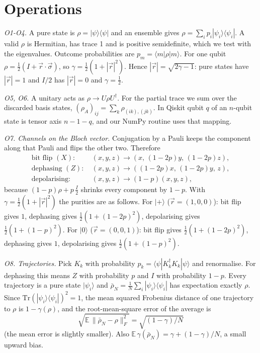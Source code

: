 \documentclass[10pt]{article}
\newcommand{\tr}{\mathrm{Tr}}
\newcommand{\lab}[1]{\noindent\textit{#1}\;}
\begin{document}
\section{Operations}
\lab{O1-O4.} A pure state is $\rho=|\psi\rangle\langle\psi|$ and an ensemble gives $\rho=\sum_ip_i|\psi_i\rangle\langle\psi_i|$. A valid $\rho$ is Hermitian, has trace 1 and is positive semidefinite, which we test with the eigenvalues. Outcome probabilities are $p_m=\langle m|\rho|m\rangle$. For one qubit $\rho=\tfrac12(I+\vec r\cdot\vec\sigma)$, so $\gamma=\tfrac12(1+|\vec r|^2)$. Hence $|\vec r|=\sqrt{2\gamma-1}$: pure states have $|\vec r|=1$ and $I/2$ has $|\vec r|=0$ and $\gamma=\tfrac12$.

\lab{O5, O6.} A unitary acts as $\rho\to U\rho U^\dagger$. For the partial trace we sum over the discarded basis states, $(\rho_A)_{ij}=\sum_k\rho_{(ik),(jk)}$. In Qiskit qubit $q$ of an $n$-qubit state is tensor axis $n-1-q$, and our NumPy routine uses that mapping.

\lab{O7. Channels on the Bloch vector.} Conjugation by a Pauli keeps the component along that Pauli and flips the other two. Therefore
\begin{align*}
\text{bit flip } (X):&\ (x,y,z)\to(x,\,(1-2p)y,\,(1-2p)z),\\
\text{dephasing } (Z):&\ (x,y,z)\to((1-2p)x,\,(1-2p)y,\,z),\\
\text{depolarising}:&\ (x,y,z)\to(1-p)(x,y,z),
\end{align*}
because $(1-p)\rho+p\,\tfrac I2$ shrinks every component by $1-p$. With $\gamma=\tfrac12(1+|\vec r|^2)$ the purities are as follows. For $|+\rangle$ ($\vec r=(1,0,0)$): bit flip gives $1$, dephasing gives $\tfrac12(1+(1-2p)^2)$, depolarising gives $\tfrac12(1+(1-p)^2)$. For $|0\rangle$ ($\vec r=(0,0,1)$): bit flip gives $\tfrac12(1+(1-2p)^2)$, dephasing gives $1$, depolarising gives $\tfrac12(1+(1-p)^2)$.

\lab{O8. Trajectories.} Pick $K_k$ with probability $p_k=\langle\psi|K_k^\dagger K_k|\psi\rangle$ and renormalise. For dephasing this means $Z$ with probability $p$ and $I$ with probability $1-p$. Every trajectory is a pure state $|\psi_i\rangle$ and $\bar\rho_N=\frac1N\sum_i|\psi_i\rangle\langle\psi_i|$ has expectation exactly $\rho$. Since $\tr(|\psi_i\rangle\langle\psi_i|)^2=1$, the mean squared Frobenius distance of one trajectory to $\rho$ is $1-\gamma(\rho)$, and the root-mean-square error of the average is
\begin{equation}
\sqrt{\mathbb E\,\|\bar\rho_N-\rho\|_F^2}=\sqrt{(1-\gamma)/N}\label{eq:err}
\end{equation}
(the mean error is slightly smaller).
Also $\mathbb E\,\gamma(\bar\rho_N)=\gamma+(1-\gamma)/N$, a small upward bias.
\end{document}
